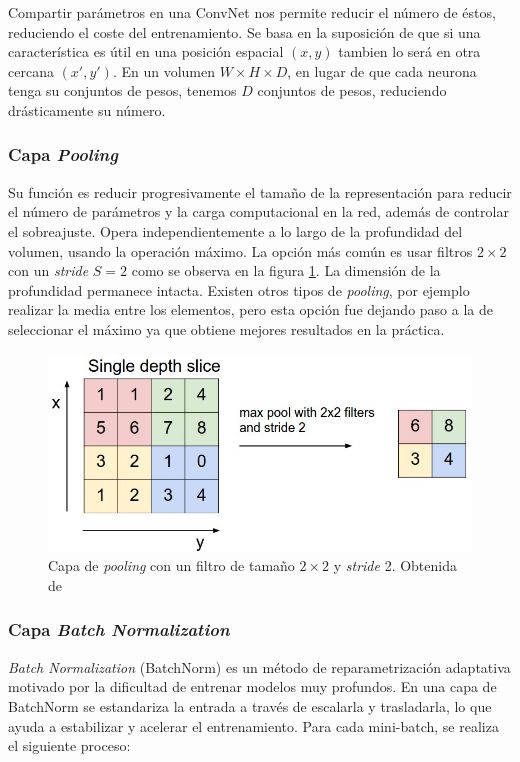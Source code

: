 Compartir parámetros en una ConvNet nos permite reducir el número de éstos, reduciendo el coste del entrenamiento. Se basa en la suposición de que si una característica es útil en una posición espacial $(x,y)$ tambien lo será en otra cercana $(x',y')$. En un volumen $W \times H \times D$, en lugar de que cada neurona tenga su conjuntos de pesos, tenemos $D$ conjuntos de pesos, reduciendo drásticamente su número. 

\subsubsection{Capa \textit{Pooling}}

Su función es reducir progresivamente el tamaño de la representación para reducir el número de parámetros y la carga computacional en la red, además de controlar el sobreajuste. Opera independientemente a lo largo de la profundidad del volumen, usando la operación máximo. La opción más común es usar filtros $2 \times 2$ con un \textit{stride} $S= 2$ como se observa en la figura \ref{fig:pooling}. La dimensión de la profundidad permanece intacta. Existen otros tipos de \textit{pooling}, por ejemplo realizar la media entre los elementos, pero esta opción fue dejando paso a la de seleccionar el máximo ya que obtiene mejores resultados en la práctica.

\begin{figure}
    \centering
    \includegraphics[width=0.75\linewidth]{Plantilla_TFG_latex//imagenes//Inf//2.Fund/maxpool.jpeg}
    \caption{Capa de \textit{pooling} con un filtro de tamaño $2 \times 2$ y \textit{stride} 2. Obtenida de \cite{stanford_231}}
    \label{fig:pooling}
\end{figure}

\subsubsection{Capa \textit{Batch Normalization}}

\textit{Batch Normalization} (BatchNorm) \cite{batchnorm} es un método de reparametrización adaptativa motivado por la dificultad de entrenar modelos muy profundos. En una capa de BatchNorm se estandariza la entrada a través de escalarla y trasladarla, lo que ayuda a estabilizar y acelerar el entrenamiento. Para cada mini-batch, se realiza el siguiente proceso:

